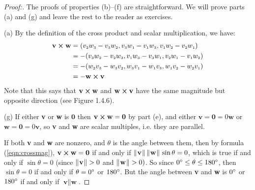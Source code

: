 \begin{proofbar}\vspace{-3mm}\begin{proof}[Proof:]
 The proofs of properties (b)--(f) are straightforward. We will prove parts (a) and (g) and leave the rest to the
 reader as exercises.
 \piccaption[]{}
 \par\noindent(a)
 By the definition of the cross product and scalar multiplication, we have:
 \begin{align*}
  \textbf{v} \bm{\times} \textbf{w} &= (v_{\scriptscriptstyle 2}w_{\scriptscriptstyle 3} - v_{\scriptscriptstyle 3}w_{\scriptscriptstyle 2},
   v_{\scriptscriptstyle 3}w_{\scriptscriptstyle 1} - v_{\scriptscriptstyle 1}w_{\scriptscriptstyle 3}, v_{\scriptscriptstyle 1}w_{\scriptscriptstyle 2} - v_{\scriptscriptstyle 2}w_{\scriptscriptstyle 1})\\
  &= -(v_{\scriptscriptstyle 3}w_{\scriptscriptstyle 2} - v_{\scriptscriptstyle 2}w_{\scriptscriptstyle 3},
   v_{\scriptscriptstyle 1}w_{\scriptscriptstyle 3} - v_{\scriptscriptstyle 3}w_{\scriptscriptstyle 1}, v_{\scriptscriptstyle 2}w_{\scriptscriptstyle 1} - v_{\scriptscriptstyle 1}w_{\scriptscriptstyle 2})\\
  &= -(w_{\scriptscriptstyle 2}v_{\scriptscriptstyle 3} - w_{\scriptscriptstyle 3}v_{\scriptscriptstyle 2},
   w_{\scriptscriptstyle 3}v_{\scriptscriptstyle 1} - w_{\scriptscriptstyle 1}v_{\scriptscriptstyle 3}, w_{\scriptscriptstyle 1}v_{\scriptscriptstyle 2} - w_{\scriptscriptstyle 2}v_{\scriptscriptstyle 1})\\
  &= -\textbf{w} \bm{\times} \textbf{v}
 \end{align*}
 Note that this says that $\textbf{v} \bm{\times} \textbf{w}$ and $\textbf{w} \bm{\times} \textbf{v}$ have the same
 magnitude but opposite direction (see Figure 1.4.6).
 \vspace{-9mm}\par\noindent(g)
 If either \textbf{v} or \textbf{w} is $\textbf{0}$ then $\textbf{v} \bm{\times} \textbf{w} = \textbf{0}$ by part (e),
 and either $\textbf{v} = \textbf{0} = 0\textbf{w}$ or $\textbf{w} = \textbf{0} = 0\textbf{v}$, so \textbf{v} and
 \textbf{w} are scalar multiples, i.e. they are parallel.
 
 If both \textbf{v} and \textbf{w} are nonzero, and $\theta$ is the angle between them, then by formula
 (\ref{eqn:crossmag}), $\textbf{v} \bm{\times} \textbf{w} = \textbf{0}$ if and only if
 $\lVert\mspace{1mu}\textbf{v}\mspace{1mu}\rVert\,\lVert\mspace{1mu}\textbf{w}\mspace{1mu}\rVert\,\sin \theta = 0$, which is true if and only if $\sin \theta = 0$ (since
 $\lVert\mspace{1mu}\textbf{v}\mspace{1mu}\rVert > 0$ and $\lVert\mspace{1mu}\textbf{w}\mspace{1mu}\rVert > 0)$. So since $0^\circ \le \theta \le 180^\circ$, then
 $\sin \theta = 0$ if and only if $\theta = 0^\circ$ or $180^\circ$. But the angle between \textbf{v} and \textbf{w}
 is $0^\circ$ or $180^\circ$ if and only if $\textbf{v} \parallel \textbf{w}$.
\end{proof}\vspace{-3mm}\end{proofbar}

